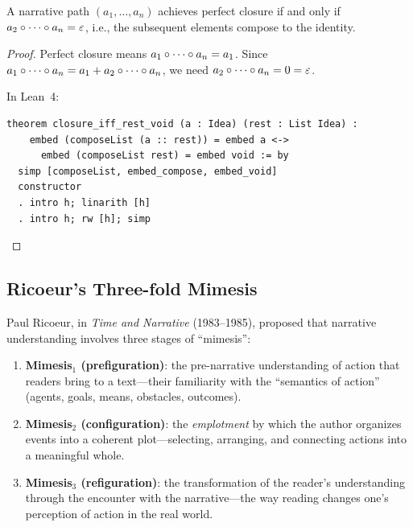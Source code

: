 \begin{theorem}
\label{thm:closure-cyclic}
A narrative path $(a_1, \ldots, a_n)$ achieves perfect closure if and only if
$a_2 \circ \cdots \circ a_n = \varepsilon$, i.e., the
subsequent elements compose to the identity.
\end{theorem}

\begin{proof}
Perfect closure means $a_1 \circ \cdots \circ a_n = a_1$.
Since $a_1 \circ \cdots \circ a_n = a_1 +
a_2 \circ \cdots \circ a_n$, we need
$a_2 \circ \cdots \circ a_n = 0 = \varepsilon$.

In Lean~4:
\begin{lstlisting}
theorem closure_iff_rest_void (a : Idea) (rest : List Idea) :
    embed (composeList (a :: rest)) = embed a <->
      embed (composeList rest) = embed void := by
  simp [composeList, embed_compose, embed_void]
  constructor
  . intro h; linarith [h]
  . intro h; rw [h]; simp
\end{lstlisting}
\end{proof}


\subsection{Ricoeur's Three-fold Mimesis}

Paul Ricoeur, in \emph{Time and Narrative} (1983--1985), proposed that narrative
understanding involves three stages of ``mimesis'':

\begin{enumerate}
\item \textbf{Mimesis$_1$ (prefiguration)}: the pre-narrative understanding of
action that readers bring to a text---their familiarity with the ``semantics
of action'' (agents, goals, means, obstacles, outcomes).
\item \textbf{Mimesis$_2$ (configuration)}: the \emph{emplotment} by which the
author organizes events into a coherent plot---selecting, arranging, and
connecting actions into a meaningful whole.
\item \textbf{Mimesis$_3$ (refiguration)}: the transformation of the reader's
understanding through the encounter with the narrative---the way reading changes
one's perception of action in the real world.
\end{enumerate}

